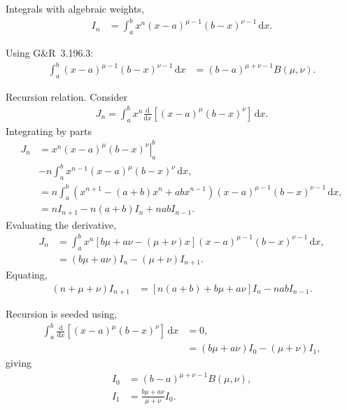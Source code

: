 \documentclass[a4paper,12pt]{article}
\newcommand{\D}{\mathrm{d}}
\begin{document}
Integrals with algebraic weights,
\begin{align*}
  I_{n}
  &=
  \int_{a}^{b}x^{n}(x-a)^{\mu-1}(b-x)^{\nu-1}\,\D x.    
\end{align*}

Using G\&R~3.196.3:
\begin{align*}
  \int_{a}^{b}(x-a)^{\mu-1}(b-x)^{\nu-1}\,\D x
  &=
    (b-a)^{\mu+\nu-1}B(\mu, \nu).
\end{align*}

Recursion relation. Consider
\begin{align*}
  J_{n} = \int_{a}^{b}
  x^{n} \frac{\D}{\D x}\left[(x-a)^{\mu}(b-x)^{\nu}\right]\,\D x.  
\end{align*}
Integrating by parts
\begin{align*}    
  J_{n} &=
    \left.
    x^{n}(x-a)^{\mu}(b-x)^{\nu}\right|_{a}^{b}\\
  &-
    n \int_{a}^{b}x^{n-1}(x-a)^{\mu}(b-x)^{\nu}\,\D x,\\
  &=
    n \int_{a}^{b}\left(x^{n+1} - (a+b)x^{n} + abx^{n-1}\right)
    (x-a)^{\mu-1}(b-x)^{\nu-1}\,\D x,\\
  &= nI_{n+1} - n(a+b)I_{n} + nabI_{n-1}.
\end{align*}
Evaluating the derivative,
\begin{align*}
  J_{n}
  &=
    \int_{a}^{b}x^{n}
    \left[
    b\mu + a\nu - (\mu+\nu)x
    \right]
    (x-a)^{\mu-1}(b-x)^{\nu-1}\,\D x,\\
  &= (b\mu + a\nu)I_{n} - (\mu+\nu)I_{n+1}.
\end{align*}
Equating,
\begin{align*}
  (n+\mu+\nu)I_{n+1}
  &=
    \left[
    n(a+b) + b\mu + a\nu
    \right]I_{n}
    -nab I_{n-1}.
\end{align*}

Recursion is seeded using,
\begin{align*}
  \int_{a}^{b}\frac{\D}{\D x}\left[(x-a)^{\mu}(b-x)^{\nu}\right]\,\D x
  &= 0,\\
  &= (b\mu + a\nu)I_{0} - (\mu+\nu)I_{1},
\end{align*}
giving
\begin{align*}
  I_{0} &= (b-a)^{\mu+\nu-1}B(\mu, \nu),\\
  I_{1} &= \frac{b\mu+a\nu}{\mu+\nu}I_{0}.
\end{align*}
\end{document}
